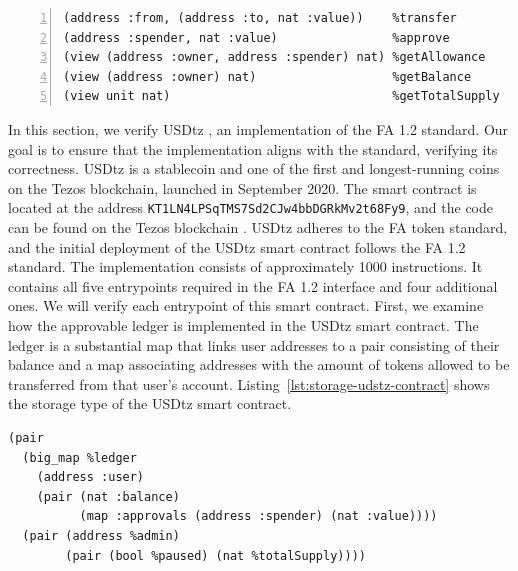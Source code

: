 \documentclass[a4paper,USenglish,cleveref, autoref, thm-restate]{lipics-v2021}
\begin{document}
\begin{lstlisting}[float=tp,captionpos=b,caption={FA 1.2 interface},label={lst:fa12-interface},numbers=left]
(address :from, (address :to, nat :value))    %transfer
(address :spender, nat :value)                %approve
(view (address :owner, address :spender) nat) %getAllowance
(view (address :owner) nat)                   %getBalance
(view unit nat)                               %getTotalSupply
\end{lstlisting}

In this section, we verify USDtz \cite{usdtzimplemetation}, an
implementation of the FA 1.2 standard. Our goal is to ensure that the
implementation aligns with the standard, verifying its
correctness. USDtz is a stablecoin and one of the first and
longest-running coins on the Tezos blockchain, launched in September
2020. The smart contract is located at the address
\texttt{KT1LN4LPSqTMS7Sd2CJw4bbDGRkMv2t68Fy9}, and the code can be
found on the Tezos blockchain \cite{tzstatsusdtz}. USDtz adheres to
the FA token standard, and the initial deployment of the USDtz smart
contract follows the FA 1.2 standard. 
The implementation consists of approximately 1000 instructions. It
contains all five entrypoints required in the FA 1.2 interface and
four additional ones.  We will verify each entrypoint of this smart
contract. First, we examine how the approvable ledger is implemented
in the USDtz smart contract. The ledger is a substantial map that
links user addresses to a pair consisting of their balance and a map
associating addresses with the amount of tokens allowed to be
transferred from that user's
account. Listing~\ref{lst:storage-udstz-contract} shows the storage type of the
USDtz smart contract.  

\begin{lstlisting}[float=tp,captionpos=b,caption={Storage of the USDtz smart contract},label={lst:storage-udstz-contract}]
(pair
  (big_map %ledger
    (address :user)
    (pair (nat :balance)
          (map :approvals (address :spender) (nat :value))))
  (pair (address %admin)
        (pair (bool %paused) (nat %totalSupply))))
\end{lstlisting}
\end{document}
